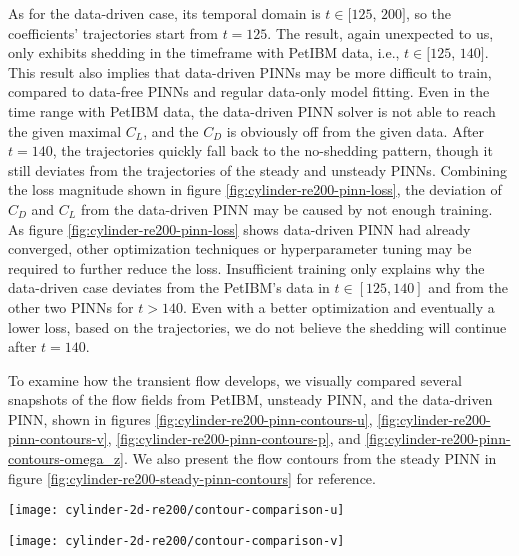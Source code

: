 As for the data-driven case, its temporal domain is $t\in[125$, $200]$, so the coefficients' trajectories start from $t=125$.
The result, again unexpected to us, only exhibits shedding in the timeframe with PetIBM data, i.e., $t\in[125$, $140]$.
This result also implies that data-driven PINNs may be more difficult to train, compared to data-free PINNs and regular data-only model fitting.
Even in the time range with PetIBM data, the data-driven PINN solver is not able to reach the given maximal $C_L$, and the $C_D$ is obviously off from the given data.
After $t=140$, the trajectories quickly fall back to the no-shedding pattern, though it still deviates from the trajectories of the steady and unsteady PINNs.
Combining the loss magnitude shown in figure \ref{fig:cylinder-re200-pinn-loss}, the deviation of $C_D$ and $C_L$ from the data-driven PINN may be caused by not enough training.
As figure \ref{fig:cylinder-re200-pinn-loss} shows data-driven PINN had already converged, other optimization techniques or hyperparameter tuning may be required to further reduce the loss.
Insufficient training only explains why the data-driven case deviates from the PetIBM's data in $t \in [125, 140]$ and from the other two PINNs for $t > 140$.
Even with a better optimization and eventually a lower loss, based on the trajectories, we do not believe the shedding will continue after $t=140$.

To examine how the transient flow develops, we visually compared several snapshots of the flow fields from PetIBM, unsteady PINN, and the data-driven PINN, shown in figures \ref{fig:cylinder-re200-pinn-contours-u}, \ref{fig:cylinder-re200-pinn-contours-v}, \ref{fig:cylinder-re200-pinn-contours-p}, and \ref{fig:cylinder-re200-pinn-contours-omega_z}.
We also present the flow contours from the steady PINN in figure \ref{fig:cylinder-re200-steady-pinn-contours} for reference.

\begin{figure*}
    \centering%
    \texttt{[image: cylinder-2d-re200/contour-comparison-u]}%
    \caption{%
        $u$-velocity comparison of 2D cylinder flow of $Re=\num{200}$ between PetIBM, unsteady PINN, and data-driven PINN.
    }
    \label{fig:cylinder-re200-pinn-contours-u}%
\end{figure*}

\begin{figure*}
    \centering%
    \texttt{[image: cylinder-2d-re200/contour-comparison-v]}%
    \caption{%
        $v$-velocity comparison of 2D cylinder flow of $Re=\num{200}$ between PetIBM, unsteady PINN, and data-driven PINN.
    }
    \label{fig:cylinder-re200-pinn-contours-v}%
\end{figure*}

